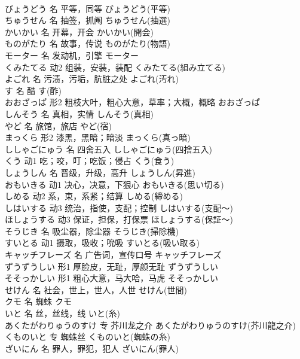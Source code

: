 \documentclass[8pt]{extreport}
\begin{document}
\begin{CJK}{UTF8}{min}
\\	びょうどう	名	平等，同等	びょうどう(平等)	
\\	ちゅうせん	名	抽签，抓阄	ちゅうせん(抽選)	
\\	かいかい	名	开幕，开会	かいかい(開会)	
\\	ものがたり	名	故事，传说	ものがたり(物語)	
\\	モーター	名	发动机，引擎	モーター	
\\	くみたてる	动2	组装，安装，装配	くみたてる(組み立てる)	
\\	よごれ	名	污渍，污垢，肮脏之处	よごれ(汚れ)	
\\	す	名	醋	す(酢)	
\\	おおざっぱ	形2	粗枝大叶，粗心大意，草率；大概，概略	おおざっぱ	
\\	しんそう	名	真相，实情	しんそう(真相)	
\\	やど	名	旅馆，旅店	やど(宿)	
\\	まっくら	形2	漆黑，黑暗；暗淡	まっくら(真っ暗)	
\\	ししゃごにゅう	名	四舍五入	ししゃごにゅう(四捨五入)	
\\	くう	动1	吃；咬，叮；吃饭；侵占	くう(食う)	
\\	しょうしん	名	晋级，升级，高升	しょうしん(昇進)	
\\	おもいきる	动1	决心，决意，下狠心	おもいきる(思い切る)	
\\	しめる	动2	系，束，系紧；结算	しめる(締める)	
\\	しはいする	动3	统治，指使，支配；控制	しはいする(支配～)	
\\	ほしょうする	动3	保证，担保，打保票	ほしょうする(保証～)	
\\	そうじき	名	吸尘器，除尘器	そうじき(掃除機)	
\\	すいとる	动1	摄取，吸收；吮吸	すいとる(吸い取る)	
\\	キャッチフレーズ	名	广告词，宣传口号	キャッチフレーズ	
\\	ずうずうしい	形1	厚脸皮，无耻，厚颜无耻	ずうずうしい	
\\	そそっかしい	形1	粗心大意，马大哈，马虎	そそっかしい	
\\	せけん	名	社会，世上，世人，人世	せけん(世間)	
\\	クモ	名	蜘蛛	クモ	
\\	いと	名	丝，丝线，线	いと(糸)	
\\	あくたがわりゅうのすけ	专	芥川龙之介	あくたがわりゅうのすけ(芥川龍之介)	
\\	くものいと	专	蜘蛛丝	くものいと(蜘蛛の糸)	
\\	ざいにん	名	罪人，罪犯，犯人	ざいにん(罪人)	

\end{CJK}
\end{document}
